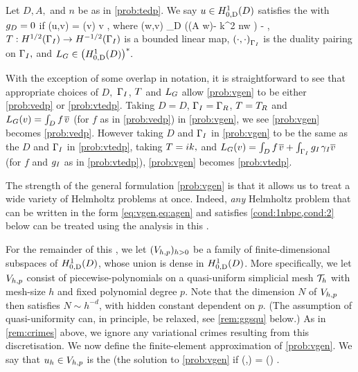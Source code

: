 \label{prob:vgen}
Let $D, A,$ and $n$ be as in \cref{prob:tedp}. We say $u \in \HozDD$ satisfies the  with $g_{D} = 0$ if
\beq\label{eq:vgen}
\aG(u,v) = \LG(v) \tfa v \in \HozDD,
\eeq
where
\beq\label{eq:agen}
\aG(w,v) \de \int_{D} \mleft(\mleft(A \grad w\mright)\cdot\grad \vbar - k^2 n\minispace w \vbar\mright) - ,
\eeq
$\T:\HhGI\rightarrow \HmhGI$ is a bounded linear map,  $\DPGI{\cdot}{\cdot}$ is the duality pairing on $\Gamma_{I},$ and $\LG  \in \HozDDs.$
\eprob

With the exception of some overlap in notation, it is straightforward to see that appropriate choices of $D,$ $\Gamma_{I}$, $T$ and $L_{G}$ allow \cref{prob:vgen} to be either \cref{prob:vedp} or \cref{prob:vtedp}. Taking $D = D$, $\Gamma_{I} = \Gamma_{R}$, $T = T_{R}$ and $L_{G}(v) = \int_{D} f\;\!\overline{v}$ (for $f$ as in \cref{prob:vedp}) in \cref{prob:vgen}, we see \cref{prob:vgen} becomes \cref{prob:vedp}. However taking $D$ and $\Gamma_{I}$ in \cref{prob:vgen} to be the same as the $D$ and $\Gamma_{I}$ in \cref{prob:vtedp}, taking $T=ik,$ and $L_{G}(v) = \int_{D} f\;\!\overline{v} + \int_{\Gamma_{I}} g_{I} \;\!\gamma_{I} \overline{v}$ (for $f$ and $g_{I}$ as in \cref{prob:vtedp}), \cref{prob:vgen} becomes \cref{prob:vtedp}.
\ere

The strength of the general formulation \cref{prob:vgen} is that it allows us to treat a wide variety of Helmholtz problems at once. Indeed, \emph{any} Helmholtz problem that can be written in the form \cref{eq:vgen,eq:agen} and satisfies \cref{cond:1nbpc,cond:2} below can be treated using the analysis in this .
\ere 

For the remainder of this , we let $(V_{h,p})_{h>0}$ be a family of finite-dimensional subspaces of $\HozDD$, whose union is dense in $\HozDD$. More specifically, we let $V_{h,p}$ consist of piecewise-polynomials on a quasi-uniform simplicial mesh $\mathcal T_{h}$ with mesh-size $h$
and fixed polynomial degree $p$. Note that the dimension $N$ of $V_{h,p}$ then satisfies $N\sim h^{-d}$, with hidden constant dependent on $p$. (The assumption of quasi-uniformity can, in principle, be relaxed, see \cref{rem:ggsqu} below.) As in \cref{rem:crimes} above, we ignore any variational crimes resulting from this discretisation. We now define the finite-element approximation of \cref{prob:vgen}.
\label{prob:fevgen}
We say that $u_{h} \in V_{h,p}$ is the  (the solution to \cref{prob:vgen} if
\beq\label{eq:galerkin}
\aG(\uh,\vh) = \LG(\vh) \tforall \vh \in \Vhp.
\eeq
\eprob

